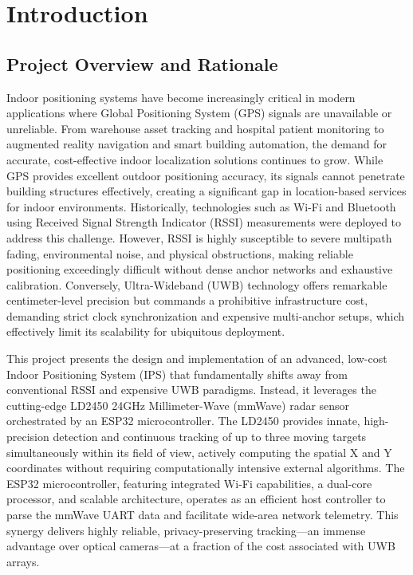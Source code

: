 \chapter{Introduction}


\section{Project Overview and Rationale}

Indoor positioning systems have become increasingly critical in modern applications where Global Positioning System (GPS) signals are unavailable or unreliable. From warehouse asset tracking and hospital patient monitoring to augmented reality navigation and smart building automation, the demand for accurate, cost-effective indoor localization solutions continues to grow. While GPS provides excellent outdoor positioning accuracy, its signals cannot penetrate building structures effectively, creating a significant gap in location-based services for indoor environments. Historically, technologies such as Wi-Fi and Bluetooth using Received Signal Strength Indicator (RSSI) measurements were deployed to address this challenge. However, RSSI is highly susceptible to severe multipath fading, environmental noise, and physical obstructions, making reliable positioning exceedingly difficult without dense anchor networks and exhaustive calibration. Conversely, Ultra-Wideband (UWB) technology offers remarkable centimeter-level precision but commands a prohibitive infrastructure cost, demanding strict clock synchronization and expensive multi-anchor setups, which effectively limit its scalability for ubiquitous deployment.\par

This project presents the design and implementation of an advanced, low-cost Indoor Positioning System (IPS) that fundamentally shifts away from conventional RSSI and expensive UWB paradigms. Instead, it leverages the cutting-edge LD2450 24GHz Millimeter-Wave (mmWave) radar sensor orchestrated by an ESP32 microcontroller. The LD2450 provides innate, high-precision detection and continuous tracking of up to three moving targets simultaneously within its field of view, actively computing the spatial X and Y coordinates without requiring computationally intensive external algorithms. The ESP32 microcontroller, featuring integrated Wi-Fi capabilities, a dual-core processor, and scalable architecture, operates as an efficient host controller to parse the mmWave UART data and facilitate wide-area network telemetry. This synergy delivers highly reliable, privacy-preserving tracking—an immense advantage over optical cameras—at a fraction of the cost associated with UWB arrays.\par

